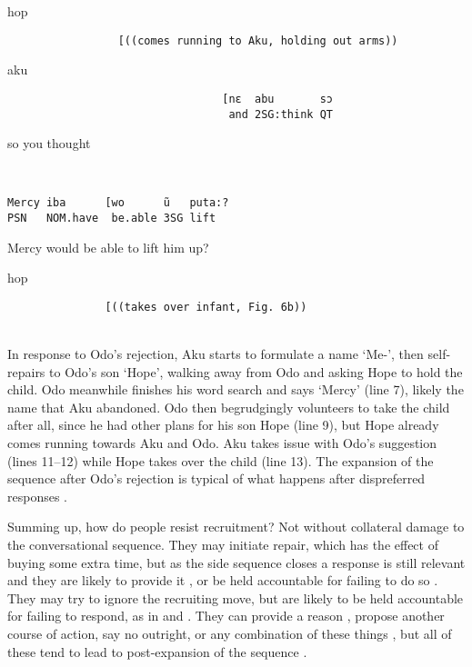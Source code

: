 \documentclass[output=paper]{langsci/langscibook}
\begin{document}
%
\begin{transbox}{10}{hop}
\begin{verbatim}
                 [((comes running to Aku, holding out arms))
\end{verbatim}
\end{transbox}
%
\begin{transbox}{11}{aku}
\begin{verbatim}
                                 [nɛ  abu       sɔ 
                                  and 2SG:think QT 
\end{verbatim}
\hspace{5cm} so you thought 
\end{transbox}
%
\begin{transbox}{12}{~}
\begin{verbatim}
Mercy iba      [wo      ũ   puta:?
PSN   NOM.have  be.able 3SG lift
\end{verbatim}
Mercy would be able to lift him up?
\end{transbox}
%
\begin{transbox}{13}{hop}
\begin{verbatim}
               [((takes over infant, Fig. 6b))
\end{verbatim}
\end{transbox}
%
\\

\normalsize
In response to Odo’s rejection, Aku starts to formulate a name ‘Me-’, then self-repairs to Odo’s son ‘Hope’, walking away from Odo and asking Hope to hold the child. Odo meanwhile finishes his word search and says ‘Mercy’ (line 7), likely the name that Aku abandoned. Odo then begrudgingly volunteers to take the child after all, since he had other plans for his son Hope (line 9), but Hope already comes running towards Aku and Odo. Aku takes issue with Odo’s suggestion (lines 11--12) while Hope takes over the child (line 13). The expansion of the sequence after Odo’s rejection is typical of what happens after dispreferred responses \citep{schegloff_sequence_2007}.

Summing up, how do people resist recruitment? Not without collateral damage to the conversational sequence. They may initiate repair, which has the effect of buying some extra time, but as the side sequence closes a response is still relevant and they are likely to provide it , or be held accountable for failing to do so . They may try to ignore the recruiting move, but are likely to be held accountable for failing to respond, as in  and . They can provide a reason , propose another course of action, say no outright, or any combination of these things , but all of these tend to lead to post-expansion of the sequence \citep[chap. 7]{Schegloff2007}.
\end{document}
